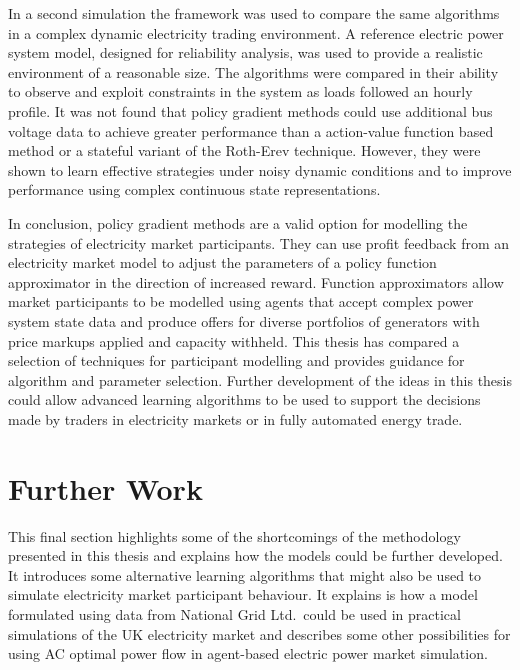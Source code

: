 In a second simulation the framework was used to compare the same algorithms in
a complex dynamic electricity trading environment.  A reference electric power
system model, designed for reliability analysis, was used to provide a
realistic environment of a reasonable size.  The algorithms were compared in
their ability to observe and exploit constraints in the system as loads followed
an hourly profile.  It was not found that policy gradient methods could use
additional bus voltage data to achieve greater performance than a action-value
function based method or a stateful variant of the Roth-Erev technique.
However, they were shown to learn effective strategies under noisy dynamic
conditions and to improve performance using complex continuous state
representations.

In conclusion, policy gradient methods are a valid option for modelling the
strategies of electricity market participants.  They can use profit feedback
from an electricity market model to adjust the parameters of a policy function
approximator in the direction of increased reward.  Function approximators allow
market participants to be modelled using agents that accept complex power system
state data and produce offers for diverse portfolios of generators with
price markups applied and capacity withheld.  This thesis has compared
a selection of techniques for participant modelling and provides guidance for
algorithm and parameter selection.
Further development of the ideas in this thesis could allow advanced learning
algorithms to be used to support the decisions made by traders in electricity
markets or in fully automated energy trade.

\section{Further Work}
\label{sec:furtherwork}
This final section highlights some of the shortcomings of the methodology
presented in this thesis and explains how the models could be further
developed. It introduces some alternative learning algorithms that might also be used to
simulate electricity market participant behaviour.
It explains is how a model formulated using data from National Grid
Ltd.~could be used in practical simulations of the UK electricity market and
describes some other possibilities for using AC optimal power flow in
agent-based electric power market simulation.

